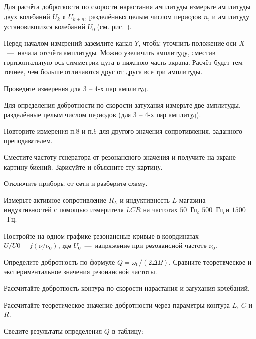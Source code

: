 \begin{lab:task}
	\item Для расчёта добротности по скорости нарастания амплитуды измерьте
амплитуды двух колебаний $U_k$ и $U_{k+n}$, разделённых целым числом периодов $n$,
и амплитуду установившихся колебаний $U_0$ (см. рис.~).

Перед началом измерений заземлите канал $Y$, чтобы уточнить положение оси
$X$~---~начала отсчёта амплитуды. Можно увеличить амплитуду, сместив
горизонтальную ось симметрии цуга в нижнюю часть экрана. Расчёт будет
тем точнее, чем больше отличаются друг от друга все три амплитуды.

Проведите измерения для 3 -- 4-х пар амплитуд.

	\item Для определения добротности по скорости затухания измерьте две
амплитуды, разделённые целым числом периодов (для 3 -- 4-х пар амплитуд).

	\item Повторите измерения п.8 и п.9 для другого значения сопротивления,
заданного преподавателем.

	\item Сместите частоту генератора от резонансного значения и получите на
экране картину биений. Зарисуйте и объясните эту картину.

	\item Отключите приборы от сети и разберите схему.

	\item Измерьте активное сопротивление $R_L$ и индуктивность $L$ магазина
индуктивностей с помощью измерителя $LCR$ на частотах $50$~Гц, $500$~Гц и $1500$~Гц.


	\item Постройте на одном графике резонансные кривые в координатах $U/U0 = f(
\nu/\nu_0)$, где $U_0$~---~напряжение при резонансной частоте $\nu_0$.

Определите добротность по формуле $Q = \omega_0/(2\Delta\Omega)$. Сравните теоретическое и
экспериментальное значения резонансной частоты.

	\item Рассчитайте добротность контура по скорости нарастания и затухания
колебаний.

	\item Рассчитайте теоретическое значение добротности через параметры
контура $L$, $C$ и $R$.

	\item Сведите результаты определения $Q$ в таблицу:


\end{lab:task}
